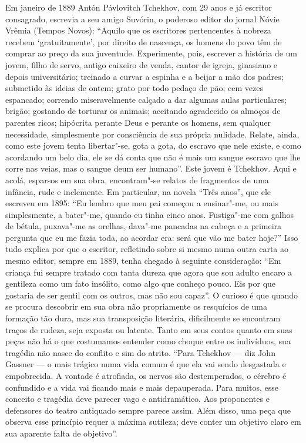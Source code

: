 Em janeiro de 1889 Antón Pávlovitch Tchekhov, com 29 anos e já escritor
consagrado, escrevia a seu amigo Suvórin, o poderoso editor do jornal
Nóvie Vrêmia (Tempos Novos): ``Aquilo que os escritores pertencentes à
nobreza recebem `gratuitamente', por direito de nascença, os homens do
povo têm de comprar ao preço da sua juventude. Experimente, pois,
escrever a história de um jovem, filho de servo, antigo caixeiro de
venda, cantor de igreja, ginasiano e depois universitário; treinado a
curvar a espinha e a beijar a mão dos padres; submetido às ideias de
ontem; grato por todo pedaço de pão; cem vezes espancado; correndo
miseravelmente calçado a dar algumas aulas particulares; brigão;
gostando de torturar os animais; aceitando agradecido os almoços de
parentes ricos; hipócrita perante Deus e perante os homens, sem qualquer
necessidade, simplesmente por consciência de sua própria nulidade.
Relate, ainda, como este jovem tenta libertar"-se, gota a gota, do
escravo que nele existe, e como acordando um belo dia, ele se dá conta
que não é mais um sangue escravo que lhe corre nas veias, mas o sangue
deum ser humano''. Este jovem é Tchekhov. Aqui e acolá, esparsos em sua
obra, encontram"-se relatos de fragmentos de uma infância, rude e
inclemente. Em particular, na novela ``Três anos'', que ele escreveu em
1895: ``Eu lembro que meu pai começou a ensinar"-me, ou mais
simplesmente, a bater"-me, quando eu tinha cinco anos. Fustiga"-me com
galhos de bétula, puxava"-me as orelhas, dava"-me pancadas na cabeça e a
primeira pergunta que eu me fazia toda, ao acordar era: será que vão me
bater hoje?'' Isso tudo explica por que o escritor, refletindo sobre si
mesmo numa outra carta ao mesmo editor, sempre em 1889, tenha chegado à
seguinte consideração: ``Em criança fui sempre tratado com tanta dureza
que agora que sou adulto encaro a gentileza como um fato insólito, como
algo que conheço pouco. Eis por que gostaria de ser gentil com os
outros, mas não sou capaz''. O curioso é que quando se procura descobrir
em sua obra não propriamente os resquícios de uma formação tão dura, mas
sua transposição literária, dificilmente se encontram traços de rudeza,
seja exposta ou latente. Tanto em seus contos quanto em suas peças não
há o que costumamos entender como choque entre os indivíduos, sua
tragédia não nasce do conflito e sim do atrito. ``Para Tchekhov --- diz
John Gassner --- o mais trágico numa vida comum é que ela vai sendo
desgastada e empobrecida. A vontade é atrofiada, os nervos são
destemperados, o cérebro é confundido e a vida vai ficando mais e mais
depauperada. Para muitos, esse conceito e tragédia deve parecer vago e
antidramático. Aos proponentes e defensores do teatro antiquado sempre
parece assim. Além disso, uma peça que observa esse princípio requer a
máxima sutileza; deve conter um objetivo claro em sua aparente falta de
objetivo''.

